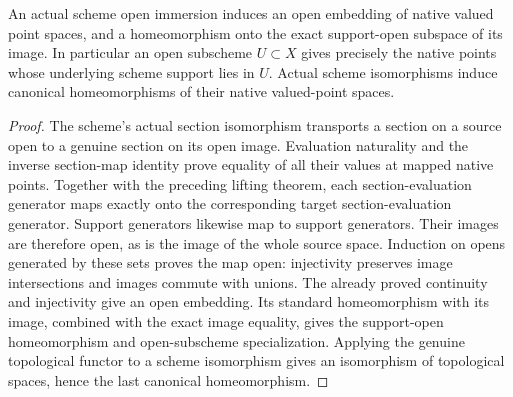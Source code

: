 \begin{theorem}
\label{scheme:valued-open-embedding}
\leanok
{}
An actual scheme open immersion induces an open embedding of native valued
point spaces, and a homeomorphism onto the exact support-open subspace of its
image. In particular an open subscheme $U\subset X$ gives precisely the native
points whose underlying scheme support lies in $U$. Actual scheme isomorphisms
induce canonical homeomorphisms of their native valued-point spaces.
\end{theorem}
\begin{proof}
The scheme's actual section isomorphism transports a section on a source open
to a genuine section on its open image. Evaluation naturality and the inverse
section-map identity prove equality of all their values at mapped native
points. Together with the preceding lifting theorem, each section-evaluation
generator maps exactly onto the corresponding target section-evaluation
generator. Support generators likewise map to support generators. Their images
are therefore open, as is the image of the whole source space. Induction on
opens generated by these sets proves the map open: injectivity preserves image
intersections and images commute with unions. The already proved continuity
and injectivity give an open embedding. Its standard homeomorphism with its
image, combined with the exact image equality, gives the support-open
homeomorphism and open-subscheme specialization. Applying the genuine
topological functor to a scheme isomorphism gives an isomorphism of
topological spaces, hence the last canonical homeomorphism.
\end{proof}
